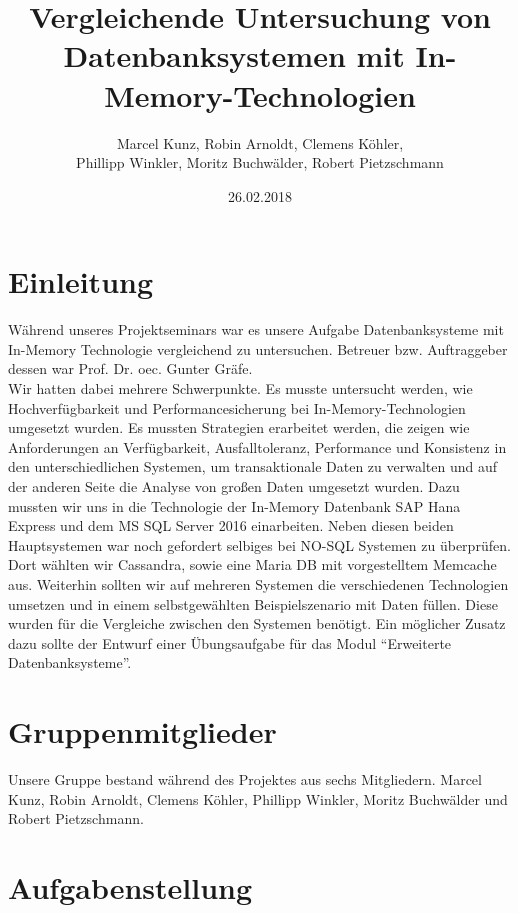 \documentclass[a4paper, 12pt]{scrartcl}
\title{Vergleichende Untersuchung von Datenbanksystemen mit In-Memory-Technologien}
\author{Marcel Kunz, Robin Arnoldt, Clemens Köhler, \\ Phillipp Winkler, Moritz Buchwälder, Robert Pietzschmann}
\date{26.02.2018}
\begin{document}
\maketitle
\newpage
\tableofcontents
\newpage

\section{Einleitung}
Während unseres Projektseminars war es unsere Aufgabe Datenbanksysteme mit In-Memory Technologie vergleichend zu untersuchen. Betreuer bzw. Auftraggeber dessen war Prof. Dr. oec. Gunter Gräfe.\\ Wir hatten dabei mehrere Schwerpunkte. Es musste untersucht werden, wie Hochverfügbarkeit und Performancesicherung bei In-Memory-Technologien umgesetzt wurden. Es mussten Strategien erarbeitet werden, die zeigen wie Anforderungen an Verfügbarkeit, Ausfalltoleranz, Performance und Konsistenz in den unterschiedlichen Systemen, um transaktionale Daten zu verwalten und auf der anderen Seite die Analyse von großen Daten umgesetzt wurden. Dazu mussten wir uns in die Technologie der In-Memory Datenbank SAP Hana Express und dem MS SQL Server 2016 einarbeiten. Neben diesen beiden Hauptsystemen war noch gefordert selbiges bei NO-SQL Systemen zu überprüfen. Dort wählten wir Cassandra, sowie eine Maria DB mit vorgestelltem Memcache aus. Weiterhin sollten wir auf mehreren Systemen die verschiedenen Technologien umsetzen und in einem selbstgewählten Beispielszenario mit Daten füllen. Diese wurden für die Vergleiche zwischen den Systemen benötigt. Ein möglicher Zusatz dazu sollte der Entwurf einer Übungsaufgabe für das Modul "`Erweiterte Datenbanksysteme"'.  

\section{Gruppenmitglieder}
Unsere Gruppe bestand während des Projektes aus sechs Mitgliedern. Marcel Kunz, Robin Arnoldt, Clemens Köhler, Phillipp Winkler, Moritz Buchwälder und Robert Pietzschmann. 
\newpage
\section{Aufgabenstellung}
\end{document}

